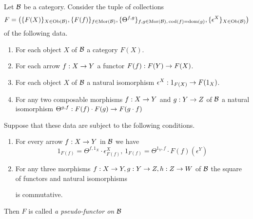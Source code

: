 \begin{definition}
Let ${\mathcal B}$ be a category. Consider the tuple of collections
$$F = \big(\{F(X)\}_{X\in \mathrm{Ob}({\mathcal B})},\{F(f)\}_{f\in \mathrm{Mor}({\mathcal B})},\{\Theta^{f,g}\}_{f,g\in \mathrm{Mor}({\mathcal B}),\,\mathrm{cod}(f)=\mathrm{dom}(g)},\{\epsilon^X\}_{X\in \mathrm{Ob}({\mathcal B})}\big)$$
of the following data.
\begin{enumerate}[label=\textbf{(\arabic*)}, leftmargin=3.0em]
\item For each object $X$ of ${\mathcal B}$ a category $F(X)$.
\item For each arrow $f:X\rightarrow Y$ a functor $F(f):F(Y)\rightarrow F(X)$.
\item For each object $X$ of ${\mathcal B}$ a natural isomorphism $\epsilon^X:1_{F(X)} \rightarrow F(1_{X})$.
\item For any two composable morphisms $f:X\rightarrow Y$ and $g:Y\rightarrow Z$ of ${\mathcal B}$ a natural isomorphism $\Theta^{g,f}: F(f)\cdot F(g) \rightarrow F(g\cdot f)$
\end{enumerate}
Suppose that these data are subject to the following conditions.
\begin{enumerate}[label=\textbf{(\arabic*)}, leftmargin=3.0em]
\item For every arrow $f:X\rightarrow Y$ in ${\mathcal B}$ we have
$$1_{F(f)} = \Theta^{f,1_X} \cdot \epsilon^X_{F(f)},\,1_{F(f)} = \Theta^{1_Y,f} \cdot F(f)\left(\epsilon^Y\right)$$
\item For any three morphisms $f:X\rightarrow Y,g:Y\rightarrow Z,h:Z\rightarrow W$ of ${\mathcal B}$ the square of functors and natural isomorphisms
\begin{center}
\end{center}
is commutative.
\end{enumerate}
Then $F$ is called \textit{a pseudo-functor on ${\mathcal B}$}
\end{definition}
